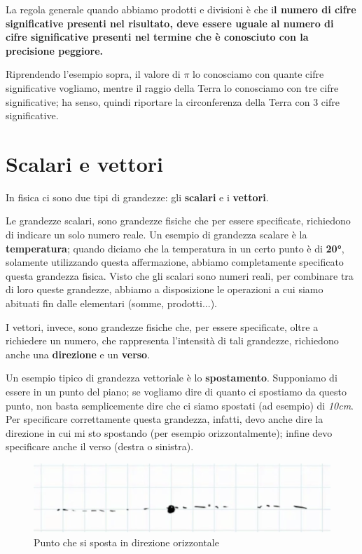 La regola generale quando abbiamo prodotti e divisioni è che i\textbf{l numero di cifre significative presenti nel risultato, deve essere uguale al numero di cifre significative presenti nel termine che è conosciuto con la precisione peggiore.}

Riprendendo l'esempio sopra, il valore di $\pi$ lo conosciamo con quante cifre significative vogliamo, mentre il raggio della Terra lo conosciamo con tre cifre significative; ha senso,  quindi riportare la circonferenza della Terra con 3 cifre significative.


\section{Scalari e vettori}
In fisica ci sono due tipi di grandezze: gli \textbf{scalari} e i \textbf{vettori}.

Le grandezze scalari, sono grandezze fisiche che per essere specificate, richiedono di indicare un solo numero reale. Un esempio di grandezza scalare è la \textbf{temperatura}; quando diciamo che la temperatura in un certo punto è di\textbf{ 20°}, solamente utilizzando questa affermazione, abbiamo completamente specificato questa grandezza fisica. Visto che gli scalari sono numeri reali, per combinare tra di loro queste grandezze, abbiamo a disposizione le operazioni a cui siamo abituati fin dalle elementari (somme, prodotti...).

I vettori, invece, sono grandezze fisiche che, per essere specificate, oltre a richiedere un numero, che rappresenta l'intensità di tali grandezze, richiedono anche una \textbf{direzione} e un \textbf{verso}.

Un esempio tipico di grandezza vettoriale è lo \textbf{spostamento}. Supponiamo di essere in un punto del piano; se vogliamo dire di quanto ci spostiamo da questo punto, non basta semplicemente dire che ci siamo spostati (ad esempio) di \textit{10cm}. Per specificare correttamente questa grandezza, infatti, devo anche dire la direzione in cui mi sto spostando (per esempio orizzontalmente); infine devo specificare anche il verso (destra o sinistra). 

\begin{figure}[h]
\begin{center}
\includegraphics[width = 0.5 \textwidth]{lezione1/images/direzione.png}
\caption{Punto che si sposta in direzione orizzontale}
\label{fig:direzione}
\end{center}
\end{figure}

